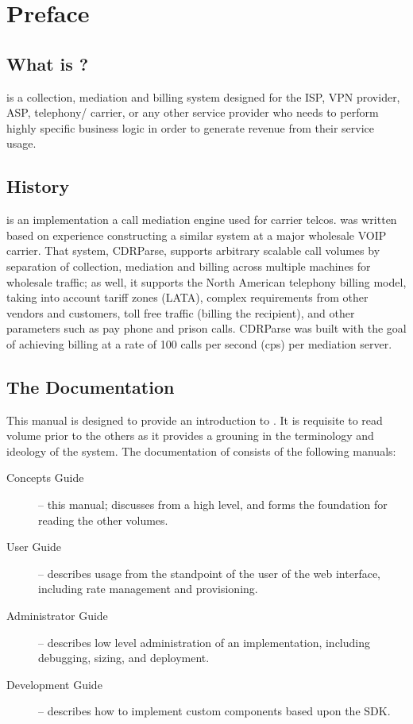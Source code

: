 \chapter{Preface}

\section{What is \XCDR{}?}

\XCDR{} is a collection, mediation and billing system designed for the ISP, VPN provider,
ASP, telephony/\VOIP{} carrier, or any other service provider who needs to perform
highly specific business logic in order to generate revenue from their service usage.

\section{History}
	\XCDR{} is an implementation a call mediation engine used for carrier
        telcos. \XCDR{} was written based on experience constructing a similar
        system at a major wholesale VOIP carrier. That system, CDRParse, supports
        arbitrary scalable call volumes by
	separation of collection, mediation and billing across multiple machines
	for wholesale \VOIP traffic; as well, it supports the North American telephony
	billing model, taking into account tariff zones (LATA), complex requirements
	from other vendors and customers, toll free traffic (billing the recipient),
	and other parameters such as pay phone and prison calls. CDRParse was built
	with the goal of achieving billing at a rate of 100 calls per second (cps) per
	mediation server.

\section{The Documentation}
This manual is designed to provide an introduction to \XCDR{}. It is requisite to read
volume prior to the others as it provides a grouning in the terminology and ideology
of the system. The documentation of \XCDR{} consists of the following manuals:

\begin{description}
\item[Concepts Guide] --
	this manual; discusses \XCDR{} from a high level, and forms the foundation
	for reading the other volumes.

\item[User Guide] --
	describes \XCDR{} usage from the standpoint of the user of the web interface,
	including rate management and provisioning.

\item[Administrator Guide] -- 
	describes low level administration of an \XCDR{} implementation, including
	debugging, sizing, and deployment.
			
\item[Development Guide] --
	describes how to implement custom components based upon the \XCDR{} SDK.

\end{description}

